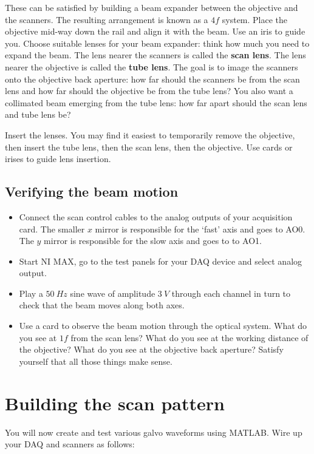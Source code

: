 \documentclass[a4paper]{report}
\begin{document}
These can be satisfied by building a beam expander between the objective and the scanners. 
The resulting arrangement is known as a $4f$ system. 
Place the objective mid-way down the rail and align it with the beam. Use an iris to guide you.
Choose suitable lenses for your beam expander: think how much you need to expand the beam. 
The lens nearer the scanners is called the \textbf{scan lens}.
The lens nearer the objective is called the \textbf{tube lens}.
The goal is to image the scanners onto the objective back aperture: how far should the scanners be from the scan lens and how far should the objective be from the tube lens?
You also want a collimated beam emerging from the tube lens: how far apart should the scan lens and tube lens be?

Insert the lenses. You may find it easiest to temporarily remove the objective, then insert the tube lens, then the scan lens, then the objective. 
Use cards or irises to guide lens insertion. 



\subsection{Verifying the beam motion}
\begin{itemize}
\item Connect the scan control cables to the analog outputs of your acquisition card. 
The smaller $x$ mirror is responsible for the `fast' axis and goes to AO0. The $y$ mirror is responsible for the slow axis and goes to to AO1. 
\item Start NI MAX, go to the test panels for your DAQ device and select analog output. 
\item Play a $50~Hz$ sine wave of amplitude $3~V$ through each channel in turn to check that the beam moves along both axes.
\item Use a card to observe the beam motion through the optical system. 
What do you see at $1f$ from the scan lens?
What do you see at the working distance of the objective?
What do you see at the objective back aperture?
Satisfy yourself that all those things make sense.
\end{itemize}

\clearpage

\section{Building the scan pattern}

You will now create and test various galvo waveforms using MATLAB. 
Wire up your DAQ and scanners as follows:
\end{document}
